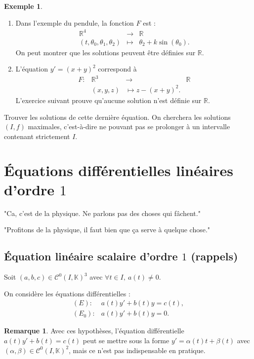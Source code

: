 \documentclass[french]{article}
\newcommand{\R}{\mathbb{R}}
\newcommand{\K}{\mathbb{K}}
\theoremstyle{plain}
\theoremstyle{definition}
\newtheorem*{ex}{Exemple}
\newtheorem*{rmq}{Remarque}
\theoremstyle{remark}
\begin{document}
\begin{ex}
	\begin{enumerate}
		\item Dans l'exemple du pendule, la fonction $F$ est :
		$$\begin{array}{rcl}
			\R^4&\longrightarrow&\R\\
			(t,\theta_0,\theta_1,\theta_2)&\longmapsto&\theta_2+k\sin(\theta_0).
		\end{array}$$
		On peut montrer que les solutions peuvent être définies sur $\R$.
		\item L'équation $y'=(x+y)^2$ correspond à 
		$$\begin{array}{lrcl}
			F:&\R^3&\longrightarrow&\R\\
			&(x,y,z)&\longmapsto z-(x+y)^2.
		\end{array}$$
		L'exercice suivant prouve qu'aucune solution n'est définie sur $\R$.
	\end{enumerate}
\end{ex}

\begin{exo}
	Trouver les solutions de cette dernière équation. On cherchera les solutions $(I,f)$ maximales, c'est-à-dire ne pouvant pas se prolonger à un intervalle contenant strictement $I$.
\end{exo}

\section{Équations différentielles linéaires d'ordre $1$}

"Ca, c'est de la physique. Ne parlons pas des choses qui fâchent."


"Profitons de la physique, il faut bien que ça serve à quelque chose."

\subsection{Équation linéaire scalaire d'ordre $1$ (rappels)}

Soit $(a,b,c)\in\mathcal{C}^0(I,\K)^3$ avec $\forall t\in I,\ a(t)\ne 0$.

On considère les équations différentielles :
\begin{align*}
	(E):&a(t)y'+b(t)y=c(t),\\
	(E_0):&a(t)y'+b(t)y=0.
\end{align*}

\begin{rmq}
	Avec ces hypothèses, l'équation différentielle $a(t)y'+b(t)=c(t)$ peut se mettre sous la forme $y'=\alpha(t)t+\beta(t)$ avec $(\alpha,\beta)\in\mathcal{C}^0(I,\K)^2$, mais ce n'est pas indispensable en pratique.
\end{rmq}
\end{document}
